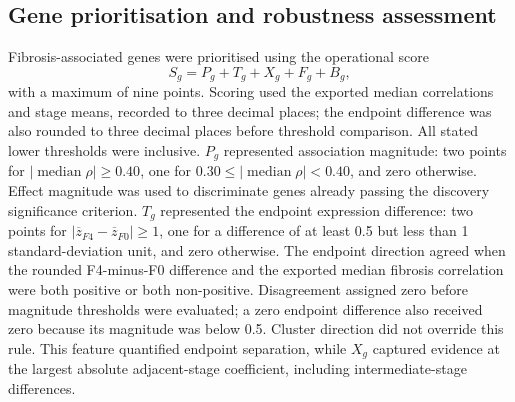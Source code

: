 \documentclass[11pt,a4paper]{article}
\begin{document}
\subsection*{Gene prioritisation and robustness assessment}
Fibrosis-associated genes were prioritised using the operational score
\[
S_g=P_g+T_g+X_g+F_g+B_g,
\]
with a maximum of nine points. Scoring used the exported median correlations and stage means, recorded to three decimal places; the endpoint difference was also rounded to three decimal places before threshold comparison. All stated lower thresholds were inclusive. \(P_g\) represented association magnitude: two points for \(|\operatorname{median}\rho|\geq0.40\), one for \(0.30\leq|\operatorname{median}\rho|<0.40\), and zero otherwise. Effect magnitude was used to discriminate genes already passing the discovery significance criterion. \(T_g\) represented the endpoint expression difference: two points for \(|\overline{z}_{F4}-\overline{z}_{F0}|\geq1\), one for a difference of at least 0.5 but less than 1 standard-deviation unit, and zero otherwise. The endpoint direction agreed when the rounded F4-minus-F0 difference and the exported median fibrosis correlation were both positive or both non-positive. Disagreement assigned zero before magnitude thresholds were evaluated; a zero endpoint difference also received zero because its magnitude was below 0.5. Cluster direction did not override this rule. This feature quantified endpoint separation, while \(X_g\) captured evidence at the largest absolute adjacent-stage coefficient, including intermediate-stage differences.
\end{document}
